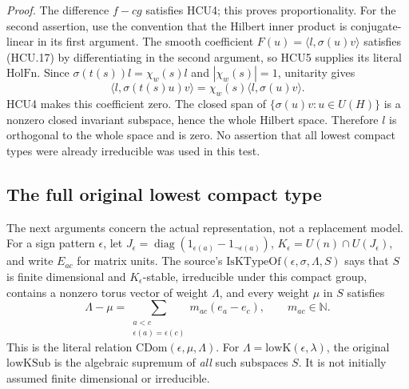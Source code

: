 \emph{Proof.}
The difference \(f-cg\) satisfies HCU4; this proves proportionality.
For the second assertion, use the convention that the Hilbert inner
product is conjugate-linear in its first argument.  The smooth
coefficient \(F(u)=\langle l,\sigma(u)v\rangle\) satisfies (HCU.17)
by differentiating in the second argument, so HCU5 supplies its
literal \(\mathrm{HolFn}\).  Since \(\sigma(t(s))l=\chi_w(s)l\)
and \(|\chi_w(s)|=1\), unitarity gives
\[
 \langle l,\sigma(t(s)u)v\rangle
       =\chi_w(s)\langle l,\sigma(u)v\rangle .
 \tag{HCU.24}
\]
HCU4 makes this coefficient zero.  The closed span of
\(\{\sigma(u)v:u\in U(H)\}\) is a nonzero closed invariant subspace,
hence the whole Hilbert space.  Therefore \(l\) is orthogonal to
the whole space and is zero.  No assertion that all lowest compact
types were already irreducible was used in this test.

\subsection*{The full original lowest compact type}

The next arguments concern the actual representation, not a replacement
model.  For a sign pattern \(\epsilon\), let
\(J_\epsilon=\operatorname{diag}(1_{\epsilon(a)}-1_{\neg\epsilon(a)})\),
\(K_\epsilon=U(n)\cap U(J_\epsilon)\), and write \(E_{ac}\) for matrix
units.  The source's \(\mathrm{IsKTypeOf}(\epsilon,\sigma,\Lambda,S)\)
says that \(S\) is finite dimensional and \(K_\epsilon\)-stable,
irreducible under this compact group, contains a nonzero torus vector
of weight \(\Lambda\), and every weight \(\mu\) in \(S\) satisfies
\[
 \Lambda-\mu
   =\sum_{\substack{a<c\\\epsilon(a)=\epsilon(c)}}m_{ac}(e_a-e_c),
 \qquad m_{ac}\in\mathbb N .
 \tag{HCU.25}
\]
This is the literal relation \(\mathrm{CDom}(\epsilon,\mu,\Lambda)\).
For \(\Lambda=\mathrm{lowK}(\epsilon,\lambda)\), the original
\(\mathrm{lowKSub}\) is the algebraic supremum of \emph{all} such
subspaces \(S\).  It is not initially assumed finite dimensional or
irreducible.

